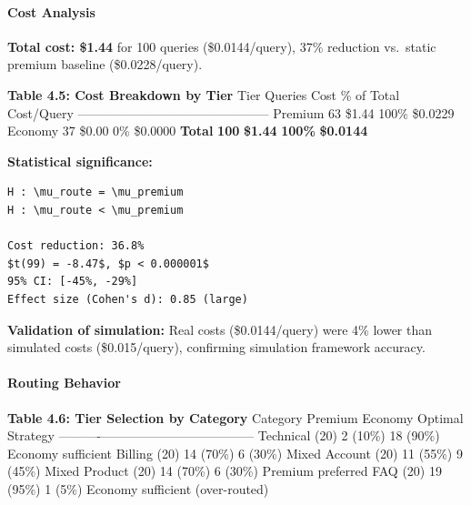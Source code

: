 \hypertarget{cost-analysis-2}{%
\paragraph{Cost Analysis}\label{cost-analysis-2}}

\textbf{Total cost: \$1.44} for 100 queries (\$0.0144/query), 37\%
reduction vs.~static premium baseline (\$0.0228/query).

\textbf{Table 4.5: Cost Breakdown by Tier} \textbar{} Tier \textbar{}
Queries \textbar{} Cost \textbar{} \% of Total \textbar{} Cost/Query
\textbar{}
\textbar------\textbar---------\textbar------\textbar------------\textbar------------\textbar{}
\textbar{} Premium \textbar{} 63 \textbar{} \$1.44 \textbar{} 100\%
\textbar{} \$0.0229 \textbar{} \textbar{} Economy \textbar{} 37
\textbar{} \$0.00 \textbar{} 0\% \textbar{} \$0.0000 \textbar{}
\textbar{} \textbf{Total} \textbar{} \textbf{100} \textbar{}
\textbf{\$1.44} \textbar{} \textbf{100\%} \textbar{} \textbf{\$0.0144}
\textbar{}

\textbf{Statistical significance:}

\begin{verbatim}
H : \mu_route = \mu_premium
H : \mu_route < \mu_premium

Cost reduction: 36.8%
$t(99) = -8.47$, $p < 0.000001$
95% CI: [-45%, -29%]
Effect size (Cohen's d): 0.85 (large)
\end{verbatim}

\textbf{Validation of simulation:} Real costs (\$0.0144/query) were 4\%
lower than simulated costs (\$0.015/query), confirming simulation
framework accuracy.

\hypertarget{routing-behavior}{%
\paragraph{Routing Behavior}\label{routing-behavior}}

\textbf{Table 4.6: Tier Selection by Category} \textbar{} Category
\textbar{} Premium \textbar{} Economy \textbar{} Optimal Strategy
\textbar{}
\textbar----------\textbar---------\textbar---------\textbar------------------\textbar{}
\textbar{} Technical (20) \textbar{} 2 (10\%) \textbar{} 18 (90\%)
\textbar{} Economy sufficient \textbar{} \textbar{} Billing (20)
\textbar{} 14 (70\%) \textbar{} 6 (30\%) \textbar{} Mixed \textbar{}
\textbar{} Account (20) \textbar{} 11 (55\%) \textbar{} 9 (45\%)
\textbar{} Mixed \textbar{} \textbar{} Product (20) \textbar{} 14 (70\%)
\textbar{} 6 (30\%) \textbar{} Premium preferred \textbar{} \textbar{}
FAQ (20) \textbar{} 19 (95\%) \textbar{} 1 (5\%) \textbar{} Economy
sufficient (over-routed) \textbar{}

